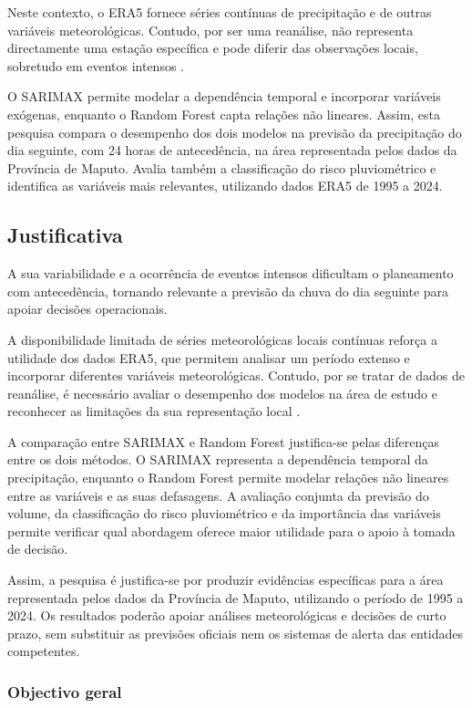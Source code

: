 \documentclass[9pt,twocolumn,twoside,english,portuguese]{opticajnl}
\begin{document}
Neste contexto, o ERA5 fornece séries contínuas de precipitação e de outras
variáveis meteorológicas. Contudo, por ser uma reanálise, não representa
directamente uma estação específica e pode diferir das observações locais,
sobretudo em eventos intensos \cite{hersbach2020era5}.

O SARIMAX permite modelar a dependência temporal e incorporar variáveis
exógenas, enquanto o Random Forest capta relações não lineares. Assim, esta pesquisa compara o desempenho dos dois modelos na previsão da precipitação do dia seguinte, com 24 horas de antecedência, na área representada pelos dados
da Província de Maputo. Avalia também a classificação do risco pluviométrico
e identifica as variáveis mais relevantes, utilizando dados ERA5 de 1995 a 2024.

\subsection{Justificativa}
A sua variabilidade e a
ocorrência de eventos intensos dificultam o planeamento com antecedência,
tornando relevante a previsão da chuva do dia seguinte para apoiar decisões
operacionais.

A disponibilidade limitada de séries meteorológicas locais contínuas reforça a utilidade dos dados ERA5, que permitem analisar um período extenso e
incorporar diferentes variáveis meteorológicas. Contudo, por se tratar de dados de reanálise, é necessário avaliar o desempenho dos modelos na área de estudo e reconhecer as limitações da sua representação local
\cite{hersbach2020era5,wmo_mozambique_2024}.

A comparação entre SARIMAX e Random Forest justifica-se pelas diferenças entre os dois métodos. O SARIMAX representa a dependência temporal da precipitação,
enquanto o Random Forest permite modelar relações não lineares entre as variáveis e as suas defasagens. A avaliação conjunta da previsão do volume, da classificação do risco pluviométrico e da importância das variáveis permite verificar qual abordagem oferece maior utilidade para o apoio à
tomada de decisão.

Assim, a pesquisa é justifica-se por produzir evidências específicas para a área
representada pelos dados da Província de Maputo, utilizando o período de 1995
a 2024. Os resultados poderão apoiar análises meteorológicas e decisões de
curto prazo, sem substituir as previsões oficiais nem os sistemas de alerta
das entidades competentes.

\subsubsection{Objectivo geral}
\end{document}
